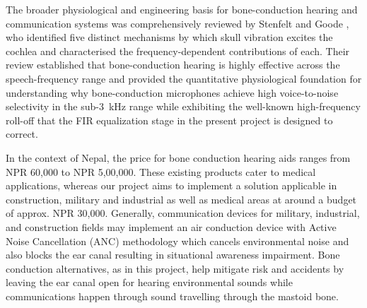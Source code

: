 The broader physiological and engineering basis for bone-conduction hearing and communication systems was comprehensively reviewed by Stenfelt and Goode \cite{stenfelt2005}, who identified five distinct mechanisms by which skull vibration excites the cochlea and characterised the frequency-dependent contributions of each. Their review established that bone-conduction hearing is highly effective across the speech-frequency range and provided the quantitative physiological foundation for understanding why bone-conduction microphones achieve high voice-to-noise selectivity in the sub-3~kHz range while exhibiting the well-known high-frequency roll-off that the FIR equalization stage in the present project is designed to correct.

In the context of Nepal, the price for bone conduction hearing aids ranges from NPR 60,000 to NPR 5,00,000. These existing products cater to medical applications, whereas our project aims to implement a solution applicable in construction, military and industrial as well as medical areas at around a budget of approx. NPR 30,000. Generally, communication devices for military, industrial, and construction fields may implement an air conduction device with Active Noise Cancellation (ANC) methodology which cancels environmental noise and also blocks the ear canal resulting in situational awareness impairment. Bone conduction alternatives, as in this project, help mitigate risk and accidents by leaving the ear canal open for hearing environmental sounds while communications happen through sound travelling through the mastoid bone.